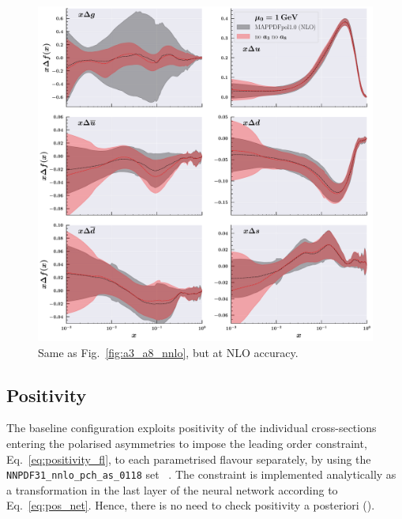 \begin{figure}[t!]
  \centering
  \includegraphics[width=\textwidth]{Chapters/Chapter_4/figs/a3_a8_nlo.pdf}
  \caption{\small{Same as Fig.~\ref{fig:a3_a8_nnlo}, but at NLO accuracy.}}
  \label{fig:a3_a8_nlo}
\end{figure}

\subsection*{Positivity}
The baseline configuration exploits positivity of the individual cross-sections entering the polarised asymmetries to impose the leading order constraint, Eq.~\eqref{eq:positivity_fl}, to each parametrised flavour separately, by using the \texttt{NNPDF31\_nnlo\_pch\_as\_0118} set ~\cite{NNPDF:2017mvq}. The constraint is implemented analytically as a transformation in the last layer of the neural network according to Eq.~\eqref{eq:pos_net}. Hence, there is no need to check positivity a posteriori ().%

